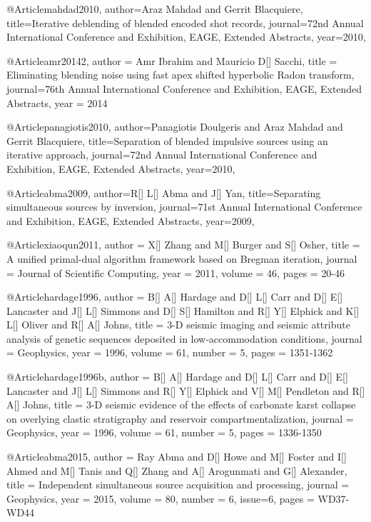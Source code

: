 @Article{mahdad2010,
  author={Araz Mahdad and Gerrit Blacquiere},
  title={Iterative deblending of blended encoded shot records},
  journal={72nd Annual International Conference and Exhibition, EAGE, Extended Abstracts},
  year=2010,
}

@Article{amr20142,
  author = 	 {Amr Ibrahim and Mauricio D[] Sacchi},
  title = 	 {Eliminating blending noise using fast apex shifted hyperbolic Radon transform},
  journal={76th Annual International Conference and Exhibition, EAGE, Extended Abstracts},
  year = 	 2014} 
  
@Article{panagiotis2010,
  author={Panagiotis Doulgeris and Araz Mahdad and Gerrit Blacquiere},
  title={Separation of blended impulsive sources using an iterative approach},
  journal={72nd Annual International Conference and Exhibition, EAGE, Extended Abstracts},
  year=2010,
}

@Article{abma2009,
  author={R[] L[] Abma and J[] Yan},
  title={Separating simultaneous sources by inversion},
  journal={71st Annual International Conference and Exhibition, EAGE, Extended Abstracts},
  year=2009,
}

@Article{xiaoqun2011,
  author = 	 {X[] Zhang and M[] Burger and S[] Osher},
  title = 	 {A unified primal-dual algorithm framework based on Bregman iteration},
  journal = 	 {Journal of Scientific Computing},
  year = 	 2011,
  volume = 	 46,
  pages = 	 {20-46}}
  
  
  
@Article{hardage1996,
  author = 	 {B[] A[] Hardage and D[] L[] Carr and D[] E[] Lancaster and J[] L[] Simmons and D[] S[] Hamilton and R[] Y[] Elphick and K[] L[] Oliver and R[] A[] Johns},
  title = 	 {3-D seismic imaging and seismic attribute analysis of genetic sequences deposited in low‐accommodation conditions},
  journal = 	 {Geophysics},
  year = 	 1996,
  volume = 	 61,
  number = 	 5,
  pages = 	 {1351-1362}}

@Article{hardage1996b,
  author = 	 {B[] A[] Hardage and D[] L[] Carr and D[] E[] Lancaster and J[] L[] Simmons and R[] Y[] Elphick and V[] M[] Pendleton and R[] A[] Johns},
  title = 	 {3-D seismic evidence of the effects of carbonate karst collapse on overlying clastic stratigraphy and reservoir compartmentalization},
  journal = 	 {Geophysics},
  year = 	 1996,
  volume = 	 61,
  number = 	 5,
  pages = 	 {1336-1350}}
 
@Article{abma2015,
  author = 	 {Ray Abma and D[] Howe and M[] Foster and I[] Ahmed and M[] Tanis and Q[] Zhang and A[] Arogunmati and G[] Alexander},
  title = 	 {Independent simultaneous source acquisition and processing},
  journal = 	 {Geophysics},
  year = 	 2015,
  volume = 	 80,
  number = 	 6,
  issue=6,
  pages = 	 {WD37-WD44}}
  

